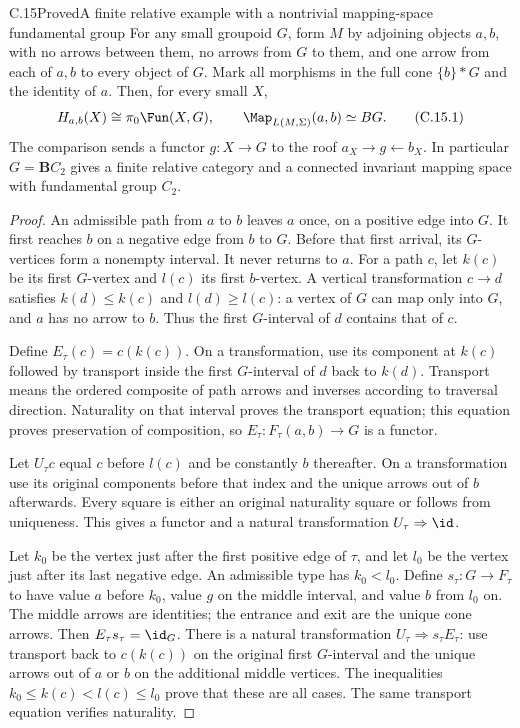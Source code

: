 \begin{claim}{C.15}{Proved}{A finite relative example with a nontrivial mapping-space fundamental group}
For any small groupoid $G$, form $M$ by adjoining objects $a,b$, with no arrows between them, no arrows from $G$ to them, and one arrow from each of $a,b$ to every object of $G$. Mark all morphisms in the full cone $\{b\}*G$ and the identity of $a$. Then, for every small $X$,
\[
 H_{a,b}(X)\cong\pi_0\Fun(X,G),\qquad
 \Map_{L(M,\Sigma)}(a,b)\simeq BG. \tag{C.15.1}
\]
The comparison sends a functor $g:X\to G$ to the roof $a_X\to g\leftarrow b_X$. In particular $G=\mathbf BC_2$ gives a finite relative category and a connected invariant mapping space with fundamental group $C_2$.
\end{claim}
\begin{proof}
An admissible path from $a$ to $b$ leaves $a$ once, on a positive edge into $G$. It first reaches $b$ on a negative edge from $b$ to $G$. Before that first arrival, its $G$-vertices form a nonempty interval. It never returns to $a$. For a path $c$, let $k(c)$ be its first $G$-vertex and $l(c)$ its first $b$-vertex. A vertical transformation $c\to d$ satisfies $k(d)\leq k(c)$ and $l(d)\geq l(c)$: a vertex of $G$ can map only into $G$, and $a$ has no arrow to $b$. Thus the first $G$-interval of $d$ contains that of $c$.

Define $E_\tau(c)=c(k(c))$. On a transformation, use its component at $k(c)$ followed by transport inside the first $G$-interval of $d$ back to $k(d)$. Transport means the ordered composite of path arrows and inverses according to traversal direction. Naturality on that interval proves the transport equation; this equation proves preservation of composition, so $E_\tau:F_\tau(a,b)\to G$ is a functor.

Let $U_\tau c$ equal $c$ before $l(c)$ and be constantly $b$ thereafter. On a transformation use its original components before that index and the unique arrows out of $b$ afterwards. Every square is either an original naturality square or follows from uniqueness. This gives a functor and a natural transformation $U_\tau\Rightarrow\id$.

Let $k_0$ be the vertex just after the first positive edge of $\tau$, and let $l_0$ be the vertex just after its last negative edge. An admissible type has $k_0<l_0$. Define $s_\tau:G\to F_\tau$ to have value $a$ before $k_0$, value $g$ on the middle interval, and value $b$ from $l_0$ on. The middle arrows are identities; the entrance and exit are the unique cone arrows. Then $E_\tau s_\tau=\id_G$. There is a natural transformation $U_\tau\Rightarrow s_\tau E_\tau$: use transport back to $c(k(c))$ on the original first $G$-interval and the unique arrows out of $a$ or $b$ on the additional middle vertices. The inequalities $k_0\leq k(c)<l(c)\leq l_0$ prove that these are all cases. The same transport equation verifies naturality.


\end{proof}
